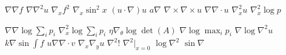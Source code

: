 \documentclass{article}
\begin{document}
$\nabla\nabla f$ $\nabla\nabla^{2}u$ $\nabla_{x}f^{2}$ $\nabla_{x}\sin^{2}x$ $(u\cdot\nabla)u$ $a\nabla$
$\nabla\times\nabla\times u$ $\nabla\nabla\cdot u$ $\nabla_{x}^{2}u$ $\nabla_{x}^{2}\log p$

$\nabla\nabla\log\sum_{i}p_{i}$ $\nabla_{x}^{2}\log\sum_{i}p_{i}$ $\eta\nabla_{\theta}\log\det(A)$
$\nabla\log\max_{i}p_{i}$ $\nabla\log\nabla^{2}u$ $k\nabla\sin\int f$ $u\nabla\nabla\cdot v$
$\nabla_{x}\nabla_{y}u$ $\nabla^{2}!$ $\nabla^{2}|_{x=0}$ $\log\nabla^{2}$ $\sin\nabla$
\end{document}
